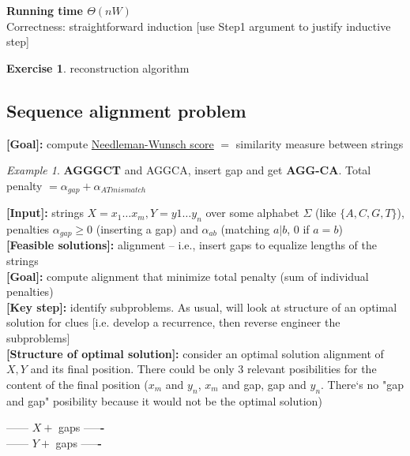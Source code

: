 \documentclass[a4paper,12pt]{article}
\theoremstyle{plain}
\theoremstyle{definition}
\newtheorem{problem}{Exercise}[section]
\theoremstyle{remark}
\newtheorem*{example}{Example}
\begin{document}
\textbf{Running time $\Theta(nW)$}
\\

Correctness: straightforward induction [use Step1 argument to justify inductive step]
\\

\begin{problem}reconstruction algorithm\end{problem}



\subsection{Sequence alignment problem}
\textbf{[Goal]:} compute \underline{Needleman-Wunsch score} $=$ similarity measure between strings

\begin{example} \textbf{AGGGCT} and AGGCA, insert gap and get \textbf{AGG-CA}. Total penalty $= \alpha_{gap} + \alpha_{AT mismatch}$\end{example}

\textbf{[Input]:} strings $X = x_1 \dots x_m, Y = y1 \dots y_n$ over some alphabet $\Sigma$ (like $\{A, C, G, T\}$), penalties $\alpha_{gap} \geq 0$ (inserting a gap) and $\alpha_{ab}$ (matching $a|b$, $0$ if $a=b$)
\\

\textbf{[Feasible solutions]:} alignment -- i.e., insert gaps to equalize lengths of the strings
\\

\textbf{[Goal]:} compute alignment that minimize total penalty (sum of individual penalties)
\\

\textbf{[Key step]:} identify subproblems. As usual, will look at structure of an optimal solution for clues [i.e. develop a recurrence, then reverse engineer the subproblems]
\\

\textbf{[Structure of optimal solution]:} consider an optimal solution alignment of $X, Y$ and its final position. There could be only 3 relevant posibilities for the content of the final position ($x_m$ and $y_n$, $x_m$ and gap, gap and $y_n$. There`s no "gap and gap" posibility because it would not be the optimal solution)\\
\begin{center}
------ $X +$ gaps -----\textbf{-}\\
------ $Y +$ gaps -----\textbf{-}\\
\end{center}
\end{document}
